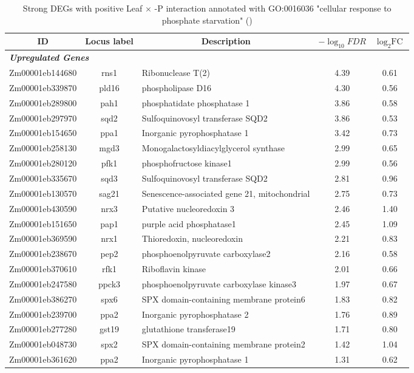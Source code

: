 \documentclass[9pt,twocolumn,twoside]{rilabRxiv}
\begin{document}
\clearpage
\begin{table}[h!]
\centering
\footnotesize
\caption{Strong DEGs with positive Leaf $\times$ -P interaction annotated with GO:0016036 "cellular response to phosphate starvation" (\cite{fattel2024}) }
\label{table:goleafxP_genes}
\begin{tabular}{ccp{7.5cm}cc}
\hline
\textbf{ID} & \textbf{Locus label} & \multicolumn{1}{c}{\textbf{Description}} & \textbf{$-\log_{10}{\textit{FDR}}$} & \textbf{$\log_2{\text{FC}}$}\\
\hline
\multicolumn{5}{l}{\textit{\textbf{Upregulated Genes}}} \\
\hline
Zm00001eb144680 & rns1 & Ribonuclease T(2) & 4.39 & 0.61\\
Zm00001eb339870 & pld16 & phospholipase D16 & 4.30 & 0.56\\
Zm00001eb289800 & pah1 & phosphatidate phosphatase 1 & 3.86 & 0.58\\
Zm00001eb297970 & sqd2 & Sulfoquinovosyl transferase SQD2 & 3.86 & 0.53\\
Zm00001eb154650 & ppa1 & Inorganic pyrophosphatase 1 & 3.42 & 0.73\\
Zm00001eb258130 & mgd3 & Monogalactosyldiacylglycerol synthase & 2.99 & 0.65\\
Zm00001eb280120 & pfk1 & phosphofructose kinase1 & 2.99 & 0.56\\
Zm00001eb335670 & sqd3 & Sulfoquinovosyl transferase SQD2 & 2.81 & 0.96\\
Zm00001eb130570 & sag21 & Senescence-associated gene 21, mitochondrial & 2.75 & 0.73\\
Zm00001eb430590 & nrx3 & Putative nucleoredoxin 3 & 2.46 & 1.40\\
Zm00001eb151650 & pap1 & purple acid phosphatase1 & 2.45 & 1.09\\
Zm00001eb369590 & nrx1 & Thioredoxin, nucleoredoxin & 2.21 & 0.83\\
Zm00001eb238670 & pep2 & phosphoenolpyruvate carboxylase2 & 2.16 & 0.58\\
Zm00001eb370610 & rfk1 & Riboflavin kinase & 2.01 & 0.66\\
Zm00001eb247580 & ppck3 & phosphoenolpyruvate carboxylase kinase3 & 1.97 & 0.67\\
Zm00001eb386270 & spx6 & SPX domain-containing membrane protein6 & 1.83 & 0.82\\
Zm00001eb239700 & ppa2 & Inorganic pyrophosphatase 2 & 1.76 & 0.89\\
Zm00001eb277280 & gst19 & glutathione transferase19 & 1.71 & 0.80\\
Zm00001eb048730 & spx2 & SPX domain-containing membrane protein2 & 1.42 & 1.04\\
Zm00001eb361620 & ppa2 & Inorganic pyrophosphatase 1 & 1.31 & 0.62\\
\hline
\end{tabular}
\end{table}
\end{document}

